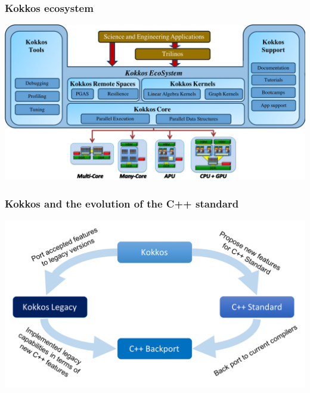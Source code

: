 \documentclass[aspectratio=169]{beamer}
\begin{document}
\begin{frame}
    \frametitle{Kokkos ecosystem}

    \begin{center}
        \includegraphics[width=\textwidth]{../../images/kokkos-ecosystem.png}
    \end{center}

\end{frame}


\begin{frame}
    \frametitle{Kokkos and the evolution of the C++ standard} 
    \begin{center}
        \includegraphics[width=\textwidth]{../../images/kokkos-cpp-standard.png}
    \end{center}
\end{frame}

\end{document}
